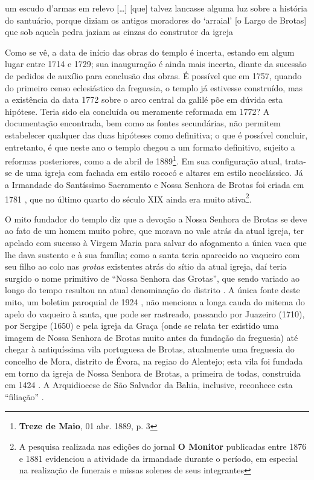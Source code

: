 \begin{citacao}
um escudo d'armas em relevo [\dots] [que] talvez lancasse alguma luz sobre a história do santuário, porque diziam os antigos moradores do `arraial' [o Largo de Brotas] que sob aquela pedra jaziam as cinzas do construtor da igreja \cite[p.~88]{campos_brotas_1942}
\end{citacao}

Como se vê, a data de início das obras do templo é incerta, estando em algum lugar entre 1714 e 1729; sua inauguração é ainda mais incerta, diante da sucessão de pedidos de auxílio para conclusão das obras. É possível que em 1757, quando do primeiro censo eclesiástico da freguesia, o templo já estivesse construído, mas a existência da data 1772 sobre o arco central da galilé põe em dúvida esta hipótese. Teria sido ela concluída ou meramente reformada em 1772? A documentação encontrada, bem como as fontes secundárias, não permitem estabelecer qualquer das duas hipóteses como definitiva; o que é possível concluir, entretanto, é que neste ano o templo chegou a um formato definitivo, sujeito a reformas posteriores, como a de abril de 1889\footnote{\textbf{Treze de Maio}, 01 abr. 1889, p. 3}. Em sua configuração atual, trata-se de uma igreja com fachada em estilo rococó e altares em estilo neoclássico. Já a Irmandade do Santíssimo Sacramento e Nossa Senhora de Brotas foi criada em 1781 \cite[p.~172]{VASCONCELOS2002}, que no último quarto do século XIX ainda era muito ativa\footnote{A pesquisa realizada nas edições do jornal \textbf{O Monitor} publicadas entre 1876 e 1881 evidenciou a atividade da irmandade durante o período, em especial na realização de funerais e missas solenes de seus integrantes}.

O mito fundador do templo diz que a devoção a Nossa Senhora de Brotas se deve ao fato de um homem muito pobre, que morava no vale atrás da atual igreja, ter apelado com sucesso à Virgem Maria para salvar do afogamento a única vaca que lhe dava sustento e à sua família; como a santa teria aparecido ao vaqueiro com seu filho ao colo nas \textit{grotas} existentes atrás do sítio da atual igreja, daí teria surgido o nome primitivo de ``Nossa Senhora das Grotas'', que sendo variado ao longo do tempo resultou na atual denominação do distrito \cite{campos_brotas_1942,texbar_capellas_1930}. A única fonte deste mito, um boletim paroquial de 1924 \cite[p.~345]{texbar_capellas_1930}, não menciona a longa cauda do mitema do apelo do vaqueiro à santa, que pode ser rastreado, passando por Juazeiro (1710), por Sergipe (1650) e pela igreja da Graça (onde se relata ter existido uma imagem de Nossa Senhora de Brotas muito antes da fundação da freguesia) \cite[p.~89-92]{campos_brotas_1942} até chegar à antiquíssima vila portuguesa de Brotas, atualmente uma freguesia do concelho de Mora, distrito de Évora, na regiao do Alentejo; esta vila foi fundada em torno da igreja de Nossa Senhora de Brotas, a primeira de todas, construida em 1424 \cite{campos_brotas_1942, correia_brotas_2010}. A Arquidiocese de São Salvador da Bahia, inclusive, reconhece esta ``filiação'' \cite{arqui_brotas_2015}.





